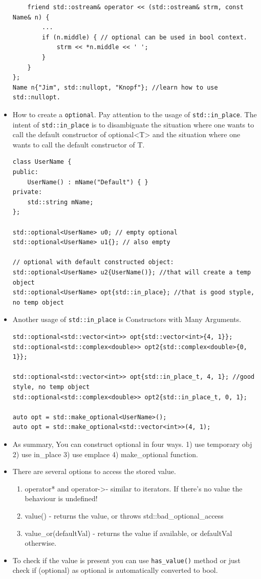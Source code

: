 \documentclass[a4paper,11pt,twoside]{book}
\begin{document}
\begin{itemize}
\begin{lstlisting}
	friend std::ostream& operator << (std::ostream& strm, const Name& n) {
		...
		if (n.middle) { // optional can be used in bool context.
			strm << *n.middle << ' ';
		}
	}
};
Name n{"Jim", std::nullopt, "Knopf"}; //learn how to use std::nullopt.	
\end{lstlisting}	
	
	
	\item How to create a \texttt{optional}. Pay attention to the usage of \texttt{std::in\_place}. The intent of \texttt{std::in\_place} is to disambiguate the situation where one wants to call the default constructor of optional<T> and the situation where one wants to call the default constructor of T.
\begin{lstlisting}
class UserName {
public:
	UserName() : mName("Default") { }
private:
	std::string mName;
};

std::optional<UserName> u0; // empty optional
std::optional<UserName> u1{}; // also empty

// optional with default constructed object:
std::optional<UserName> u2{UserName()}; //that will create a temp object
std::optional<UserName> opt{std::in_place}; //that is good styple, no temp object	
\end{lstlisting}	

	\item Another usage of \texttt{std::in\_place} is Constructors with Many Arguments. 
\begin{lstlisting}
std::optional<std::vector<int>> opt{std::vector<int>{4, 1}};
std::optional<std::complex<double>> opt2{std::complex<double>{0, 1}};

std::optional<std::vector<int>> opt{std::in_place_t, 4, 1}; //good style, no temp object
std::optional<std::complex<double>> opt2{std::in_place_t, 0, 1};

auto opt = std::make_optional<UserName>();
auto opt = std::make_optional<std::vector<int>>(4, 1);	
\end{lstlisting}	
	\item As summary, You can construct optional in four ways. 1) use temporary obj 2) use in\_place 3) use emplace 4) make\_optional function.
	
	\item There are several options to access the stored value.
	\begin{enumerate}
		\item operator* and operator->- similar to iterators. If there’s no value the behaviour is undefined!
		\item value() - returns the value, or throws std::bad\_optional\_access
		\item value\_or(defaultVal) - returns the value if available, or defaultVal otherwise.
	\end{enumerate}
	\item To check if the value is present you can use \texttt{has\_value()} method or just check if (optional) as optional is automatically converted to bool.
	

\end{itemize}
\end{document}
